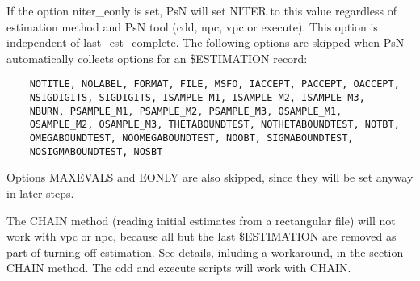 	If the option niter\_eonly is set, PsN will set NITER to this value regardless of estimation method and PsN tool (cdd, npc, vpc or execute). This option is independent of last\_est\_complete.
	The following options are skipped when PsN automatically collects options for an \$ESTIMATION record:
	\begin{verbatim}
	NOTITLE, NOLABEL, FORMAT, FILE, MSFO, IACCEPT, PACCEPT, OACCEPT,
	NSIGDIGITS, SIGDIGITS, ISAMPLE_M1, ISAMPLE_M2, ISAMPLE_M3,
	NBURN, PSAMPLE_M1, PSAMPLE_M2, PSAMPLE_M3, OSAMPLE_M1,
	OSAMPLE_M2, OSAMPLE_M3, THETABOUNDTEST, NOTHETABOUNDTEST, NOTBT,
	OMEGABOUNDTEST, NOOMEGABOUNDTEST, NOOBT, SIGMABOUNDTEST,
	NOSIGMABOUNDTEST, NOSBT
	\end{verbatim}
	Options MAXEVALS and EONLY are also skipped, since they will be set anyway in later steps.
	
	The CHAIN method (reading initial estimates from a rectangular file) will not work with vpc or npc, because all but the last \$ESTIMATION are removed as part of turning off estimation. See details, inluding a workaround, in the section CHAIN method. The cdd and execute scripts will work with CHAIN.
	
	
	

